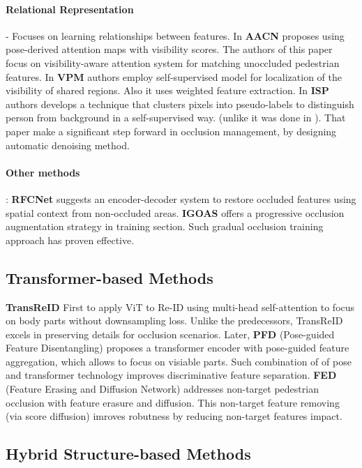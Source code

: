 \documentclass[12pt, a4paper]{article}
\begin{document}
\paragraph{Relational Representation} - Focuses on learning relationships between features.
In \textbf{AACN} \cite{AACN} proposes using pose-derived attention maps with visibility scores. The authors of this paper focus on visibility-aware attention system for matching unoccluded pedestrian features. In \textbf{VPM} \cite{VPM} authors employ self-supervised model for localization of the visibility of shared regions. Also it uses weighted feature extraction.  In \textbf{ISP} \cite{ISP} authors develops a technique that clusters pixels into pseudo-labels to distinguish person from background in a self-supervised way. (unlike it was done in \cite{GASM}). That paper make a significant step forward in occlusion management, by designing automatic denoising method. 

\paragraph{Other methods}: \textbf{RFCNet} \cite{RFCNet} suggests an encoder-decoder system to restore occluded features using spatial context from non-occluded areas. \textbf{IGOAS} \cite{IGOAS} offers a progressive occlusion augmentation strategy in training section. Such gradual occlusion training approach has proven effective.

\subsection{Transformer-based Methods} 

\textbf{TransReID} \cite{TransReID} First to apply ViT to Re-ID using multi-head self-attention to focus on body parts without downsampling loss. Unlike the predecessors, TransReID excels in preserving details for occlusion scenarios. Later, \textbf{PFD} (Pose-guided Feature Disentangling) \cite{PFD} proposes a transformer encoder with pose-guided feature aggregation, which allows to focus on visiable parts. Such combination of of pose and transformer technology improves discriminative feature separation. \textbf{FED} (Feature Erasing and Diffusion Network) \cite{FED} addresses non-target pedestrian occlusion with feature erasure and diffusion. This non-target feature removing (via score diffusion) imroves robutness by reducing non-target features impact. 

\subsection{Hybrid Structure-based Methods}
\end{document}
